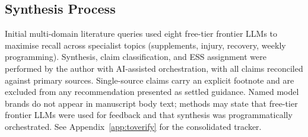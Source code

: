 \subsection*{Synthesis Process}

Initial multi-domain literature queries used eight free-tier frontier LLMs to maximise recall across specialist topics (supplements, injury, recovery, weekly programming). Synthesis, claim classification, and ESS assignment were performed by the author with AI-assisted orchestration, with all claims reconciled against primary sources. Single-source claims carry an explicit footnote and are excluded from any recommendation presented as settled guidance. Named model brands do not appear in manuscript body text; methods may state that free-tier frontier LLMs were used for feedback and that synthesis was programmatically orchestrated. See Appendix~\ref{app:toverify} for the consolidated \toverify tracker.

